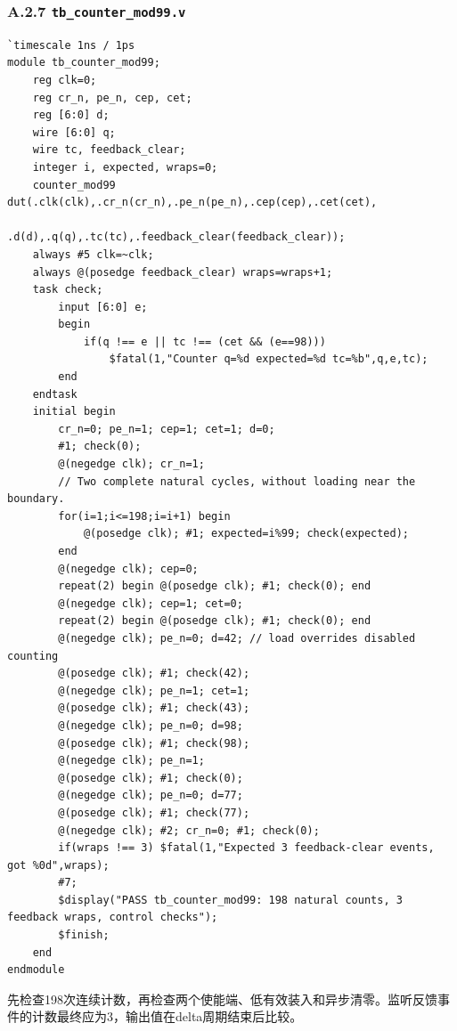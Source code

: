 \documentclass[12pt,a4paper]{ctexart}
\begin{document}
\subsubsection*{A.2.7 \texttt{tb\_counter\_mod99.v}}
\begin{lstlisting}
`timescale 1ns / 1ps
module tb_counter_mod99;
    reg clk=0;
    reg cr_n, pe_n, cep, cet;
    reg [6:0] d;
    wire [6:0] q;
    wire tc, feedback_clear;
    integer i, expected, wraps=0;
    counter_mod99 dut(.clk(clk),.cr_n(cr_n),.pe_n(pe_n),.cep(cep),.cet(cet),
                      .d(d),.q(q),.tc(tc),.feedback_clear(feedback_clear));
    always #5 clk=~clk;
    always @(posedge feedback_clear) wraps=wraps+1;
    task check;
        input [6:0] e;
        begin
            if(q !== e || tc !== (cet && (e==98)))
                $fatal(1,"Counter q=%d expected=%d tc=%b",q,e,tc);
        end
    endtask
    initial begin
        cr_n=0; pe_n=1; cep=1; cet=1; d=0;
        #1; check(0);
        @(negedge clk); cr_n=1;
        // Two complete natural cycles, without loading near the boundary.
        for(i=1;i<=198;i=i+1) begin
            @(posedge clk); #1; expected=i%99; check(expected);
        end
        @(negedge clk); cep=0;
        repeat(2) begin @(posedge clk); #1; check(0); end
        @(negedge clk); cep=1; cet=0;
        repeat(2) begin @(posedge clk); #1; check(0); end
        @(negedge clk); pe_n=0; d=42; // load overrides disabled counting
        @(posedge clk); #1; check(42);
        @(negedge clk); pe_n=1; cet=1;
        @(posedge clk); #1; check(43);
        @(negedge clk); pe_n=0; d=98;
        @(posedge clk); #1; check(98);
        @(negedge clk); pe_n=1;
        @(posedge clk); #1; check(0);
        @(negedge clk); pe_n=0; d=77;
        @(posedge clk); #1; check(77);
        @(negedge clk); #2; cr_n=0; #1; check(0);
        if(wraps !== 3) $fatal(1,"Expected 3 feedback-clear events, got %0d",wraps);
        #7;
        $display("PASS tb_counter_mod99: 198 natural counts, 3 feedback wraps, control checks");
        $finish;
    end
endmodule
\end{lstlisting}
先检查198次连续计数，再检查两个使能端、低有效装入和异步清零。监听反馈事件的计数最终应为3，输出值在delta周期结束后比较。
\end{document}

